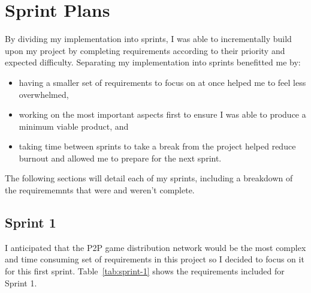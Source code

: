 \section{Sprint Plans}\label{sec:sprints}

By dividing my implementation into sprints, I was able to incrementally build upon my project by completing requirements according to their priority and expected difficulty. Separating my implementation into sprints benefitted me by:

\begin{itemize}
  \item having a smaller set of requirements to focus on at once helped me to feel less overwhelmed,
  \item working on the most important aspects first to ensure I was able to produce a minimum viable product, and
  \item taking time between sprints to take a break from the project helped reduce burnout and allowed me to prepare for the next sprint.
\end{itemize}

\newparagraph
The following sections will detail each of my sprints, including a breakdown of the requirememnts that were and weren't complete.

\subsection*{Sprint 1}

I anticipated that the P2P game distribution network would be the most complex and time consuming set of requirements in this project so I decided to focus on it for this first sprint. Table~\ref{tab:sprint-1} shows the requirements included for Sprint 1.

